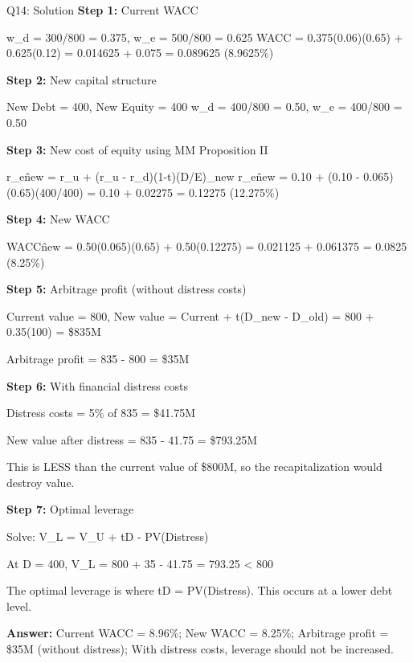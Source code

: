 \documentclass{beamer}
\renewcommand{\scriptsize}{\fontsize{6pt}{7pt}\selectfont}
\begin{document}
	\begin{frame}{Q14: Solution}
		\scriptsize
		\textbf{Step 1:} Current WACC
		
		w\_d = 300/800 = 0.375, w\_e = 500/800 = 0.625
		WACC = 0.375(0.06)(0.65) + 0.625(0.12) = 0.014625 + 0.075 = 0.089625 (8.9625\%)
		
		\vspace{2pt}
		\textbf{Step 2:} New capital structure
		
		New Debt = 400, New Equity = 400
		w\_d = 400/800 = 0.50, w\_e = 400/800 = 0.50
		
		\vspace{2pt}
		\textbf{Step 3:} New cost of equity using MM Proposition II
		
		r\_e\^{new} = r\_u + (r\_u - r\_d)(1-t)(D/E)\_new
		r\_e\^{new} = 0.10 + (0.10 - 0.065)(0.65)(400/400) = 0.10 + 0.02275 = 0.12275 (12.275\%)
		
		\vspace{2pt}
		\textbf{Step 4:} New WACC
		
		WACC\^{new} = 0.50(0.065)(0.65) + 0.50(0.12275) = 0.021125 + 0.061375 = 0.0825 (8.25\%)
		
		\vspace{2pt}
		\textbf{Step 5:} Arbitrage profit (without distress costs)
		
		Current value = 800, New value = Current + t(D\_new - D\_old) = 800 + 0.35(100) = \$835M
		
		Arbitrage profit = 835 - 800 = \$35M
		
		\vspace{2pt}
		\textbf{Step 6:} With financial distress costs
		
		Distress costs = 5\% of 835 = \$41.75M
		
		New value after distress = 835 - 41.75 = \$793.25M
		
		This is LESS than the current value of \$800M, so the recapitalization would destroy value.
		
		\vspace{2pt}
		\textbf{Step 7:} Optimal leverage
		
		Solve: V\_L = V\_U + tD - PV(Distress)
		
		At D = 400, V\_L = 800 + 35 - 41.75 = 793.25 < 800
		
		The optimal leverage is where tD = PV(Distress). This occurs at a lower debt level.
		
		\textbf{Answer:} Current WACC = 8.96\%; New WACC = 8.25\%; Arbitrage profit = \$35M (without distress); With distress costs, leverage should not be increased.
	\end{frame}
	
\end{document}
